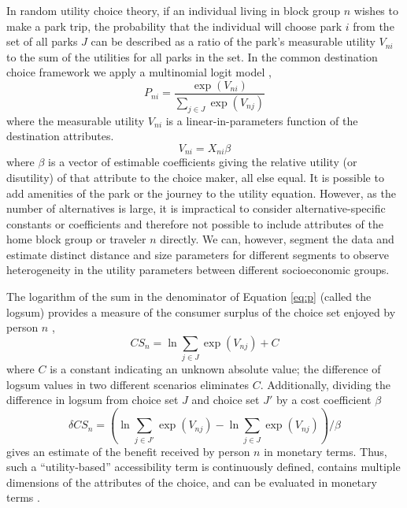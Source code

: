 \documentclass[3p, authoryear, review]{elsarticle} %
\begin{document}
In random utility choice theory, if an individual living in block group \(n\)
wishes to make a park trip, the probability that the individual will choose park
\(i\) from the set of all parks \(J\) can be described as a ratio of the park's
measurable utility \(V_{ni}\) to the sum of the utilities for all parks in the
set. In the common destination choice framework we apply a multinomial logit
model \citep{McFadden1974, Recker1978},
\begin{equation}\label{eq:p}
   P_{ni} = \frac{\exp(V_{ni})}{\sum_{j \in J}\exp(V_{nj})}
\end{equation}
where the measurable utility \(V_{ni}\) is a linear-in-parameters function of
the destination attributes.
\begin{equation}\label{eq:V}
V_{ni} = X_{ni}\beta
\end{equation}
where \(\beta\) is a vector of estimable coefficients giving the relative utility
(or disutility) of that attribute to the choice maker, all else equal. It is
possible to add amenities of the park or the journey to the utility equation.
However, as the number of alternatives is large, it is impractical to consider
alternative-specific constants or coefficients and therefore not possible to
include attributes of the home block group or traveler \(n\) directly. We can,
however, segment the data and estimate distinct distance and size parameters
for different segments to observe heterogeneity in the utility parameters
between different socioeconomic groups.

The logarithm of the sum in the denominator of Equation \ref{eq:p} (called the
logsum) provides a measure of the consumer surplus of the choice set enjoyed by
person \(n\) \citep{Williams1977a},
\begin{equation}
CS_n = \ln{{\sum_{j \in J}\exp(V_{nj})}} + C
  \label{eq:logsum}
\end{equation}
where \(C\) is a constant indicating an unknown absolute value; the difference of
logsum values in two different scenarios eliminates \(C\). Additionally, dividing
the difference in logsum from choice set \(J\) and choice set \(J'\) by a cost
coefficient \(\beta\)
\begin{equation}
\delta CS_n = (\ln{\sum_{j \in J'}\exp(V_{nj})} - \ln{\sum_{j \in J}\exp(V_{nj})})/\beta
  \label{eq:deltalogsum}
\end{equation}
gives an estimate of the benefit received by person \(n\) in monetary terms. Thus,
such a ``utility-based'' accessibility term is continuously defined, contains
multiple dimensions of the attributes of the choice, and can be evaluated in
monetary terms \citep{Handy1997, Dong2006}.
\end{document}
